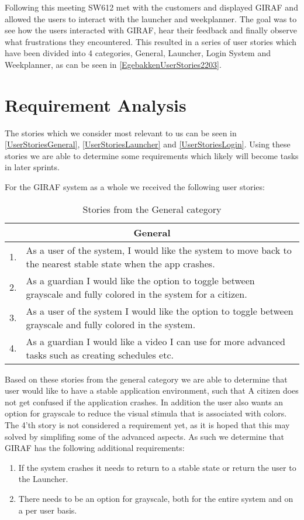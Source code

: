 Following this meeting SW612 met with the customers and displayed GIRAF and
allowed the users to interact with the launcher and weekplanner. The goal was to
see how the users interacted with GIRAF, hear their feedback and finally
observe what frustrations they encountered. This resulted in a series of user
stories which have been divided into 4 categories, General, Launcher, Login
System and Weekplanner, as can be seen in \autoref{EgebakkenUserStories2203}.

\section{Requirement Analysis}
The stories which we consider most relevant to us can be seen in
\autoref{UserStoriesGeneral}, \autoref{UserStoriesLauncher} and
\autoref{UserStoriesLogin}. Using these stories we are able to determine some
requirements which likely will become tasks in later sprints.\nl

For the GIRAF system as a whole we received the following user stories:
\begin{table}[H]
\begin{tabular}{|c|p{12.5cm}|}
\hline 
\multicolumn{2}{|c|}{General}\\\hline
1. & As a user of the system, I would like the system to move back to the
nearest stable state when the app crashes.\\\hline
2. & As a guardian I would like the option to toggle between grayscale and fully
colored in the system for a citizen. \\ \hline
3. & As a user of the system I would like the option to toggle between grayscale
and fully colored in the system. \\\hline
4. & As a guardian I would like a video I can use for more advanced tasks such
as creating schedules etc.\\\hline
\end{tabular}
\caption{Stories from the General category}
\label{UserStoriesGeneral}
\end{table}

Based on these stories from the general category we are able to determine that
user would like to have a stable application environment, such that A
citizen does not get confused if the application crashes. In addition the user
also wants an option for grayscale to reduce the visual stimula that is
associated with colors. The 4'th story is not considered a requirement yet, as
it is hoped that this may solved by simplifing some of the advanced aspects. As
such we determine that GIRAF has the following additional requirements:
\begin{enumerate}
  \item If the system crashes it needs to return to a stable state or return the
  user to the Launcher.
  \item There needs to be an option for grayscale, both for the entire system
  and on a per user basis.
\end{enumerate}

